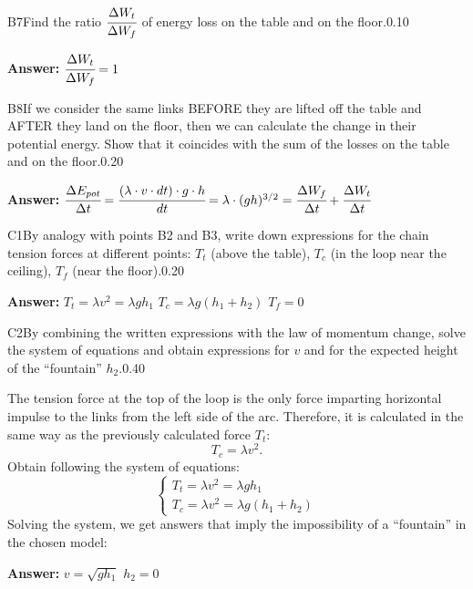 \documentclass[11pt,a4paper]{article}
\begin{document}
\begin{solcard}{B7}{Find the ratio $\cfrac{\Delta W_t}{\Delta W_f}$ of energy loss on the table and on the floor.}{0.10}
\par\smallskip\noindent\textbf{Answer:} $\cfrac{\Delta W_t}{\Delta W_f} = 1$
\end{solcard}

\begin{solcard}{B8}{If we consider the same links BEFORE they are lifted off the table and AFTER they land on the floor, then we can calculate the change in their potential energy. Show that it coincides with the sum of the losses on the table and on the floor.}{0.20}
\par\smallskip\noindent\textbf{Answer:} $\cfrac{\Delta E_{pot}}{\Delta t} = \cfrac {(\lambda \cdot v \cdot dt) \cdot g \cdot h}{dt} = \lambda \cdot (gh)^{3/2} = \cfrac {\Delta W_f}{\Delta t} + \cfrac {\Delta W_t}{\Delta t}$
\end{solcard}

\begin{solcard}{C1}{By analogy with points B2 and B3, write down expressions for the chain tension forces at different points: $T_t$ (above the table), $T_c$ (in the loop near the ceiling), $T_f$ (near the floor).}{0.20}
\par\smallskip\noindent\textbf{Answer:} $T_t = \lambda v^2 = \lambda gh_1$ $T_c = \lambda g (h_1 + h_2)$ $T_f = 0$
\end{solcard}

\begin{solcard}{C2}{By combining the written expressions with the law of momentum change, solve the system of equations and obtain expressions for $v$ and for the expected height of the “fountain” $h_2$.}{0.40}

The tension force at the top of the loop is the only force imparting horizontal impulse to the links from the left side of the arc. Therefore, it is calculated in the same way as the previously calculated force $T_t$:$$T_c = \lambda v^2.$$ Obtain following the system of equations: $$ \begin{cases} T_t = \lambda v^2 = \lambda g h_1 \\ T_c = \lambda v^2 = \lambda g (h_1 + h_2) \end{cases} $$ Solving the system, we get answers that imply the impossibility of a “fountain” in the chosen model:

\par\smallskip\noindent\textbf{Answer:} $v = \sqrt{gh_1}$ $h_2 = 0$
\end{solcard}
\end{document}
